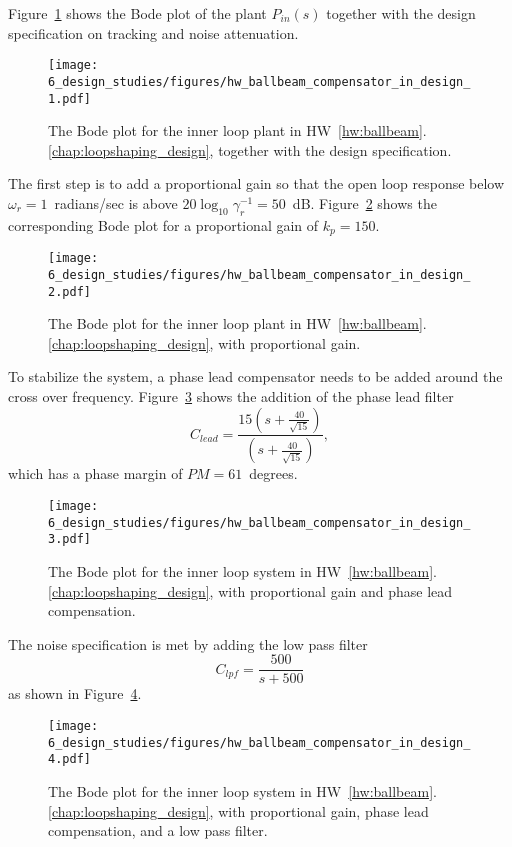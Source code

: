 Figure~\ref{fig:hw_ballbeam_compensator_in_design_1} shows the Bode plot of the plant $P_{in}(s)$ together with the design specification on tracking and noise attenuation.
%
\begin{figure}[H]
   \centering
   \texttt{[image: 6\_design\_studies/figures/hw\_ballbeam\_compensator\_in\_design\_1.pdf]}
   \caption{The Bode plot for the inner loop plant in HW~\ref{hw:ballbeam}.\ref{chap:loopshaping_design}, together with the design specification.}
   \label{fig:hw_ballbeam_compensator_in_design_1}
\end{figure}
The first step is to add a proportional gain so that the open loop response below $\omega_r=1$~radians/sec is above $20\log_{10}\gamma_r^{-1} = 50$~dB.  Figure~\ref{fig:hw_ballbeam_compensator_in_design_2} shows the corresponding Bode plot for a proportional gain of $k_p=150$.
\begin{figure}[H]
   \centering
   \texttt{[image: 6\_design\_studies/figures/hw\_ballbeam\_compensator\_in\_design\_2.pdf]}
   \caption{The Bode plot for the inner loop plant in HW~\ref{hw:ballbeam}.\ref{chap:loopshaping_design}, with proportional gain.}
   \label{fig:hw_ballbeam_compensator_in_design_2}
\end{figure}
To stabilize the system, a phase lead compensator needs to be added around the cross over frequency.  Figure~\ref{fig:hw_ballbeam_compensator_in_design_3} shows the addition of the phase lead filter
\[
C_{lead} = \frac{15(s+\frac{40}{\sqrt{15}})}{(s+\frac{40}{\sqrt{15}})},
\]
which has a phase margin of $PM=61$~degrees.
\begin{figure}[H]
   \centering
   \texttt{[image: 6\_design\_studies/figures/hw\_ballbeam\_compensator\_in\_design\_3.pdf]}
   \caption{The Bode plot for the inner loop system in HW~\ref{hw:ballbeam}.\ref{chap:loopshaping_design}, with proportional gain and phase lead compensation.}
   \label{fig:hw_ballbeam_compensator_in_design_3}
\end{figure}
The noise specification is met by adding the low pass filter
\[
C_{lpf} = \frac{500}{s+500}
\]
as shown in Figure~\ref{fig:hw_ballbeam_compensator_in_design_4}.
\begin{figure}[H]
   \centering
   \texttt{[image: 6\_design\_studies/figures/hw\_ballbeam\_compensator\_in\_design\_4.pdf]}
   \caption{The Bode plot for the inner loop system in HW~\ref{hw:ballbeam}.\ref{chap:loopshaping_design}, with proportional gain, phase lead compensation, and a low pass filter.}
   \label{fig:hw_ballbeam_compensator_in_design_4}
\end{figure}
